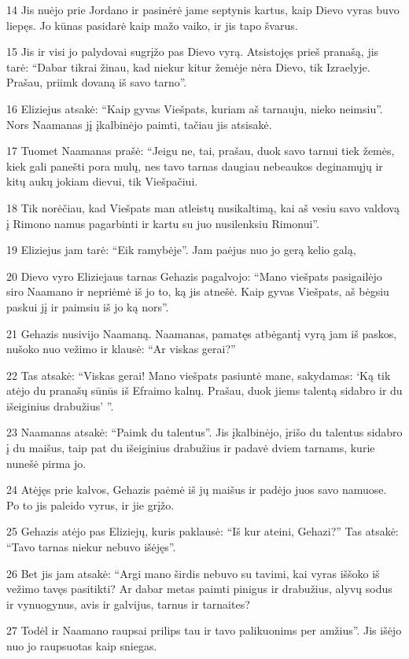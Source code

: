 \par 14 Jis nuėjo prie Jordano ir pasinėrė jame septynis kartus, kaip Dievo vyras buvo liepęs. Jo kūnas pasidarė kaip mažo vaiko, ir jis tapo švarus. 
\par 15 Jis ir visi jo palydovai sugrįžo pas Dievo vyrą. Atsistojęs prieš pranašą, jis tarė: “Dabar tikrai žinau, kad niekur kitur žemėje nėra Dievo, tik Izraelyje. Prašau, priimk dovaną iš savo tarno”. 
\par 16 Eliziejus atsakė: “Kaip gyvas Viešpats, kuriam aš tarnauju, nieko neimsiu”. Nors Naamanas jį įkalbinėjo paimti, tačiau jis atsisakė. 
\par 17 Tuomet Naamanas prašė: “Jeigu ne, tai, prašau, duok savo tarnui tiek žemės, kiek gali panešti pora mulų, nes tavo tarnas daugiau nebeaukos deginamųjų ir kitų aukų jokiam dievui, tik Viešpačiui. 
\par 18 Tik norėčiau, kad Viešpats man atleistų nusikaltimą, kai aš vesiu savo valdovą į Rimono namus pagarbinti ir kartu su juo nusilenksiu Rimonui”. 
\par 19 Eliziejus jam tarė: “Eik ramybėje”. Jam paėjus nuo jo gerą kelio galą, 
\par 20 Dievo vyro Eliziejaus tarnas Gehazis pagalvojo: “Mano viešpats pasigailėjo siro Naamano ir nepriėmė iš jo to, ką jis atnešė. Kaip gyvas Viešpats, aš bėgsiu paskui jį ir paimsiu iš jo ką nors”. 
\par 21 Gehazis nusivijo Naamaną. Naamanas, pamatęs atbėgantį vyrą jam iš paskos, nušoko nuo vežimo ir klausė: “Ar viskas gerai?” 
\par 22 Tas atsakė: “Viskas gerai! Mano viešpats pasiuntė mane, sakydamas: ‘Ką tik atėjo du pranašų sūnūs iš Efraimo kalnų. Prašau, duok jiems talentą sidabro ir du išeiginius drabužius’ ”. 
\par 23 Naamanas atsakė: “Paimk du talentus”. Jis įkalbinėjo, įrišo du talentus sidabro į du maišus, taip pat du išeiginius drabužius ir padavė dviem tarnams, kurie nunešė pirma jo. 
\par 24 Atėjęs prie kalvos, Gehazis paėmė iš jų maišus ir padėjo juos savo namuose. Po to jis paleido vyrus, ir jie grįžo. 
\par 25 Gehazis atėjo pas Eliziejų, kuris paklausė: “Iš kur ateini, Gehazi?” Tas atsakė: “Tavo tarnas niekur nebuvo išėjęs”. 
\par 26 Bet jis jam atsakė: “Argi mano širdis nebuvo su tavimi, kai vyras iššoko iš vežimo tavęs pasitikti? Ar dabar metas paimti pinigus ir drabužius, alyvų sodus ir vynuogynus, avis ir galvijus, tarnus ir tarnaites? 
\par 27 Todėl ir Naamano raupsai prilips tau ir tavo palikuonims per amžius”. Jis išėjo nuo jo raupsuotas kaip sniegas.



